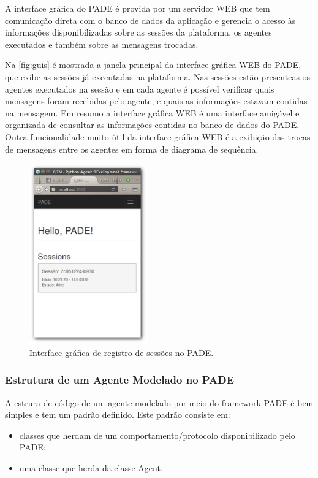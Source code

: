\documentclass[journal]{IEEEtran}
\begin{document}
A interface gráfica do PADE é provida por um servidor WEB que tem comunicação direta com o banco de dados da aplicação e gerencia o acesso às informações disponibilizadas sobre as sessões da plataforma, os agentes executados e também sobre as mensagens trocadas.

Na  \autoref{fig:guis} é mostrada a janela principal da interface gráfica WEB do PADE, que exibe as sessões já executadas na plataforma. Nas sessões estão presenteas os agentes executados na sessão e em cada agente é possível verificar quais mensagens foram recebidas pelo agente, e quais as informações estavam contidas na mensagem. Em resumo a interface gráfica WEB é uma interface amigável e organizada de consultar as informações contidas no banco de dados do PADE. Outra funcionalidade muito útil da interface gráfica WEB é a exibição das trocas de mensagens entre os agentes em forma de diagrama de sequência.

\begin{figure}[!htb]
        \centering
        \includegraphics[width=2.0in]{Figuras/web_gui.png}
        \caption{\label{fig:guis} Interface gráfica de registro de sessões no PADE.}
\end{figure} 

\subsubsection{Estrutura de um Agente Modelado no PADE}

A estrura de código de um agente modelado por meio do framework PADE é bem simples e tem um padrão definido. Este padrão consiste em:

\begin{itemize}
    \item classes que herdam de um comportamento/protocolo disponibilizado pelo PADE;
    \item uma classe que herda da classe Agent.
\end{itemize}
\end{document}
